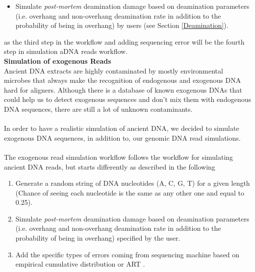\documentclass[11pt,a4paper]{report}
\begin{document}
\begin{itemize}
 
\item Simulate \emph{post-mortem} deamination damage based on 
deamination parameters (i.e. overhang and non-overhang deamination 
rate in addition to the probability of being in overhang) by users
(see Section \ref{Deamination}). 

\end{itemize}

as the third step in the workflow and adding sequencing error will be
the fourth step in simulation aDNA reads workflow.\\

\textbf{Simulation of exogenous Reads }\\

Ancient DNA extracts are highly contaminated by 
mostly environmental microbes that always make the 
recognition of endogenous and exogenous DNA hard for aligners.
Although there is a database of known exogenous DNAs that could help 
us to detect exogenous sequences and don't mix them with endogenous 
DNA sequences, there are still a lot of unknown contaminants.
\\\\
In order to have a realistic simulation of ancient DNA, we decided to
simulate exogenous DNA sequences, in addition to, our genomic DNA 
read simulations.
\\\\
The exogenous read simulation workflow follows the workflow for 
simulating ancient DNA reads, but starts differently as described 
in the following 

\begin{enumerate}

 \item Generate a random string of DNA nucleotides (A, C, G, T) 
 for a given length (Chance of seeing each nucleotide is the same as any
  other one and equal to 0.25).

\item Simulate \emph{post-mortem} deamination damage based on deamination
 parameters (i.e. overhang and non-overhang deamination rate in addition to 
 the probability of being in overhang) specified by the user. 

 \item Add the specific types of errors coming from sequencing machine 
 based on empirical cumulative distribution or ART\cite{art} .

\end{enumerate}
\end{document}
